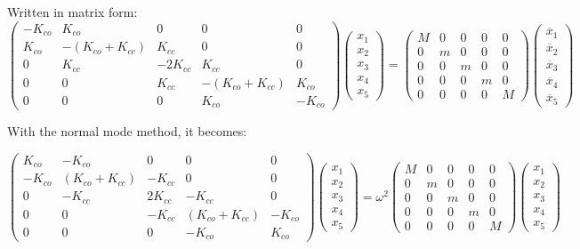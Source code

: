 \documentclass[11pt,letterpaper]{article}
\begin{document}
Written in matrix form:
$$
\begin{pmatrix}
 -K_{co} & K_{co} & 0 & 0 & 0 \\
 K_{co} & -(K_{co}+K_{cc}) & K_{cc} & 0 & 0 \\
 0 & K_{cc} & -2K_{cc} & K_{cc} & 0 \\
 0 & 0 & K_{cc} & -(K_{co}+K_{cc}) & K_{co} \\
 0 & 0 & 0 & K_{co} & -K_{co} 
\end{pmatrix}
\begin{pmatrix}
 x_1\\
 x_2\\
 x_3\\
 x_4\\
 x_5
\end{pmatrix}
=
\begin{pmatrix}
 M & 0 & 0 & 0 & 0\\
 0 & m & 0 & 0 & 0\\
 0 & 0 & m & 0 & 0\\
 0 & 0 & 0 & m & 0\\
 0 & 0 & 0 & 0 & M
\end{pmatrix}
\begin{pmatrix}
 \ddot{x_1}\\
 \ddot{x_2}\\
 \ddot{x_3}\\
 \ddot{x_4}\\
 \ddot{x_5}
\end{pmatrix}
$$

With the normal mode method, it becomes:

$$
\begin{pmatrix}
 K_{co} & -K_{co} & 0 & 0 & 0 \\
 -K_{co} & (K_{co}+K_{cc}) & -K_{cc} & 0 & 0 \\
 0 & -K_{cc} & 2K_{cc} & -K_{cc} & 0 \\
 0 & 0 & -K_{cc} & (K_{co}+K_{cc}) & -K_{co} \\
 0 & 0 & 0 & -K_{co} & K_{co} 
\end{pmatrix}
\begin{pmatrix}
 x_1\\
 x_2\\
 x_3\\
 x_4\\
 x_5
\end{pmatrix}
=\omega^2
\begin{pmatrix}
 M & 0 & 0 & 0 & 0\\
 0 & m & 0 & 0 & 0\\
 0 & 0 & m & 0 & 0\\
 0 & 0 & 0 & m & 0\\
 0 & 0 & 0 & 0 & M
\end{pmatrix}
\begin{pmatrix}
 x_1\\
 x_2\\
 x_3\\
 x_4\\
 x_5
\end{pmatrix}
$$
\end{document}

